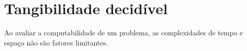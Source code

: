 \chapter{Tangibilidade decidível}

Ao avaliar a computabilidade de um problema, as complexidades de tempo e espaço não são fatores limitantes.
